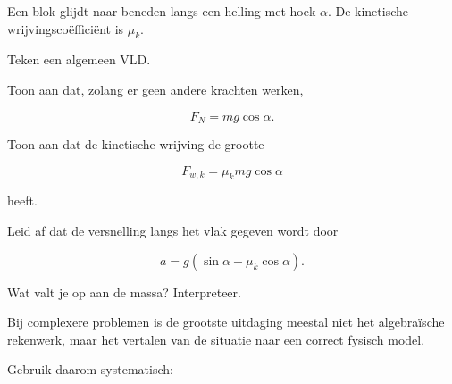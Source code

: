 \documentclass{ximera}
\begin{document}
\begin{oefening}{\oefU\ESS}

Een blok glijdt naar beneden langs een helling met hoek $\alpha$.
De kinetische wrijvingscoëfficiënt is $\mu_k$.

\begin{question}
Teken een algemeen VLD.
\end{question}

\begin{question}
Toon aan dat, zolang er geen andere krachten werken,

\[
F_N=mg\cos\alpha.
\]

\end{question}

\begin{question}
Toon aan dat de kinetische wrijving de grootte

\[
F_{w,k}=\mu_kmg\cos\alpha
\]

heeft.
\end{question}

\begin{question}
Leid af dat de versnelling langs het vlak gegeven wordt door

\[
\boxed{
a=g(\sin\alpha-\mu_k\cos\alpha).
}
\]

\end{question}

\begin{question}
Wat valt je op aan de massa? Interpreteer.
\end{question}

\end{oefening}




Bij complexere problemen is de grootste uitdaging meestal niet het
algebraïsche rekenwerk, maar het vertalen van de situatie naar een
correct fysisch model.

Gebruik daarom systematisch:
\end{document}
